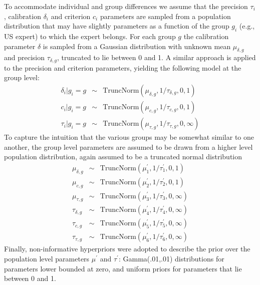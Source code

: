 \documentclass[doc]{apa6} %
\begin{document}
To accommodate individual and group differences we assume that the precision $\tau_{i}$, calibration $\delta_i$ and criterion $c_i$ parameters are sampled from a population distribution that may have slightly parameters as a function of the group $g_i$ (e.g., US expert) to which the expert belongs. For each group $g$ the calibration parameter $\delta$ is sampled from a Gaussian distribution with unknown mean $\mu_{\delta,g}$ and precision $\tau_{\delta,g}$, truncated to lie between 0 and 1. A similar approach is applied to the precision and criterion parameters, yielding the following model at the group level:
\begin{eqnarray*}
\delta_i | g_i=g & \sim & \mbox{TruncNorm}(\mu_{\delta,g}, 1/\tau_{\delta,g},0,1) \\
c_i | g_i=g & \sim & \mbox{TruncNorm}(\mu_{c,g}, 1/\tau_{c,g},0,1) \\
\tau_i | g_i=g & \sim & \mbox{TruncNorm}(\mu_{\tau,g}, 1/\tau_{\tau,g},0,\infty)
\end{eqnarray*}
To capture the intuition that the various groups may be somewhat similar to one another, the group level parameters are assumed to be drawn from a higher level population distribution, again assumed to be a truncated normal distribution
\begin{eqnarray*}
\mu_{\delta,g} & \sim &  \mbox{TruncNorm}(\mu^\prime_1,1/\tau^\prime_1,0,1) \\
\mu_{c,g} & \sim & \mbox{TruncNorm}(\mu^\prime_2,1/\tau^\prime_2,0,1) \\
\mu_{\tau,g} & \sim & \mbox{TruncNorm}(\mu^\prime_3,1/\tau^\prime_3,0,\infty) \\
\tau_{\delta,g} & \sim & \mbox{TruncNorm}(\mu^\prime_4,1/\tau^\prime_4,0,\infty) \\
\tau_{c,g} & \sim & \mbox{TruncNorm}(\mu^\prime_5,1/\tau^\prime_5,0,\infty) \\
\tau_{\tau,g} & \sim & \mbox{TruncNorm}(\mu^\prime_6,1/\tau^\prime_6,0,\infty)
\end{eqnarray*}
Finally, non-informative hyperpriors were adopted to describe the prior over the population level parameters $\mu^\prime$ and $\tau^\prime$: Gamma(.01,.01) distributions for parameters lower bounded at zero, and uniform priors for parameters that lie between 0 and 1.
\end{document}
